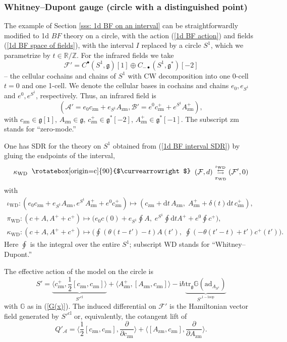 \documentclass{amsart}
\theoremstyle{plain} %
\theoremstyle{definition}
\theoremstyle{remark}
\newcommand{\g}{\mathfrak{g}}
\newcommand{\mr}{\mathrm}
\newcommand{\bt}{\bullet}
\newcommand{\ad}{\mathrm{ad}}
\newcommand{\F}{\mathcal{F}}
\newcommand{\dd}{\partial}
\newcommand{\iii}{\mathrm{i}}
\newcommand{\SDR}[5]{#5\;\;\raisebox{1.3pt}{\rotatebox[origin=c]{90}{$\curvearrowright$}}\;\; #1 \underset{#4}{\stackrel{#3}{\leftrightarrows}} #2}  %
\newcommand{\cl}{\mathrm{cl}}
\newcommand{\A}{\mathcal{A}}
\newcommand{\B}{\mathcal{B}}
\newcommand{\zm}{\mathrm{zm}}
\newcommand{\dr}{\mathrm{d}}
\begin{document}
\subsubsection{Whitney--Dupont gauge (circle with a distinguished point)}
The example of Section \ref{sss: 1d BF on an interval} can be straightforwardly modified to 1d $BF$ theory on a circle, with the action (\ref{1d BF action}) and fields (\ref{1d BF space of fields}), with the interval $I$ replaced by a circle $S^1$, which we parametrize by $t\in \mathbb{R}/\mathbb{Z}$. For the infrared fields we take
\begin{equation}\label{1d BF on S^1, IR fields}
    \F'=C^\bt(S^1,\g)[1]\oplus C_{-\bt}(S^1,\g^*)[-2]
\end{equation}
-- the cellular cochains and chains of $S^1$ with CW decomposition into one 0-cell $t=0$ and one 1-cell. We denote the cellular bases in cochains and chains $e_0, e_{S^1}$ and $e^0,e^{S^1}$, respectively. Thus, an infrared field is
\begin{equation}
    (\A'=e_0c_\zm+e_{S^1}A_\zm,\B'=e^0 c^+_\zm+ e^{S^1} A^+_\zm),
\end{equation}
with $c_\zm\in \g[1]$, $A_\zm\in\g$, $c^+_\zm\in \g^*[-2]$, $A^+_\zm\in \g^*[-1]$. The subscript zm stands for ``zero-mode.''

One has SDR for the theory on $S^1$ obtained from (\ref{1d BF interval SDR}) by gluing the endpoints of the interval,
\begin{equation}
    \SDR{(\F,d)}{(\F',0)}{\iota_\mr{WD}}{\pi_\mr{WD}}{\kappa_\mr{WD}}
\end{equation}
with
\begin{multline}
    \iota_\mr{WD}\colon  (e_0 c_\zm+ e_{S^1} A_\zm, e^{S^1} A^+_\zm+ e^0 c^+_\zm) \mapsto (c_\zm+\dr t\, A_\zm,\; A^+_\zm+\delta(t)\dr t\, c^+_\zm),\\
    \pi_\mr{WD}\colon (c+A,A^++c^+)\mapsto \Big(e_0 c(0)+e_{S^1} \oint A,\; e^{S^1} \oint \dr t A^+ + e^0 \oint c^+\Big),\\
    \kappa_\mr{WD}\colon (c+A,A^++c^+)\mapsto \Big(\oint (\theta(t-t')-t)A(t'),\;\oint (-\theta(t'-t)+t')c^+(t')\Big).
\end{multline}
Here $\oint$ is the integral over the entire $S^1$; subscript $\mr{WD}$ stands for ``Whitney--Dupont.''

The effective action of the model on the circle is
\begin{equation}
    S'=\underbrace{\langle c^+_\zm,\frac12[c_\zm,c_\zm] \rangle}_{S'^\cl}+ \langle A^+_\zm,[A_\zm,c_\zm] \rangle - \iii\hbar \underbrace{\mr{tr}_\g \mathbb{G}(\ad_{A_{S^1}})}_{S'^{\mr{1-loop}}}
\end{equation}
with $\mathbb{G}$ as in (\ref{G(x)}). The induced differential on $\F'$ is the Hamiltonian vector field generated by $S'^\cl$ or, equivalently, the cotangent lift of
\begin{equation}
    Q'_\A = \langle \frac12 [c_\zm,c_\zm],\frac{\dd}{\dd c_\zm}\rangle +
    \langle [A_\zm,c_\zm],\frac{\dd}{\dd A_\zm} \rangle.
\end{equation}
\end{document}
